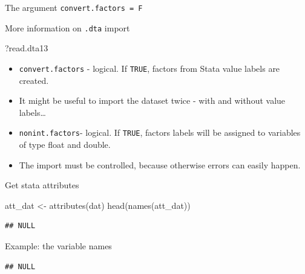 \documentclass[
  10pt,
  ignorenonframetext,
]{beamer}
\newenvironment{Shaded}{\begin{snugshade}}{\end{snugshade}}
\newcommand{\KeywordTok}[1]{\textcolor[rgb]{0.94,0.87,0.69}{#1}}
\newcommand{\NormalTok}[1]{\textcolor[rgb]{0.80,0.80,0.80}{#1}}
\newcommand{\OperatorTok}[1]{\textcolor[rgb]{0.94,0.94,0.82}{#1}}
\newcommand{\StringTok}[1]{\textcolor[rgb]{0.80,0.58,0.58}{#1}}
\begin{document}
\begin{frame}[fragile]{The argument \texttt{convert.factors\ =\ F}}
\protect\hypertarget{the-argument-convert.factors-f}{}

\begin{block}{More information on \texttt{.dta} import}

\begin{Shaded}
\begin{Highlighting}[]
\NormalTok{?read.dta13}
\end{Highlighting}
\end{Shaded}

\begin{itemize}
\item
  \texttt{convert.factors} - logical. If \texttt{TRUE}, factors from
  Stata value labels are created.
\item
  It might be useful to import the dataset twice - with and without
  value labels\ldots{}
\item
  \texttt{nonint.factors}- logical. If \texttt{TRUE}, factors labels
  will be assigned to variables of type float and double.
\item
  The import must be controlled, because otherwise errors can easily
  happen.
\end{itemize}

\end{block}

\end{frame}

\begin{frame}[fragile]{Get stata attributes}
\protect\hypertarget{get-stata-attributes}{}

\begin{Shaded}
\begin{Highlighting}[]
\NormalTok{att_dat <-}\StringTok{ }\KeywordTok{attributes}\NormalTok{(dat)}
\KeywordTok{head}\NormalTok{(}\KeywordTok{names}\NormalTok{(att_dat))}
\end{Highlighting}
\end{Shaded}

\begin{verbatim}
## NULL
\end{verbatim}

\begin{block}{Example: the variable names}

\begin{Shaded}
\end{Shaded}

\begin{verbatim}
## NULL
\end{verbatim}

\end{block}

\end{frame}
\end{document}
